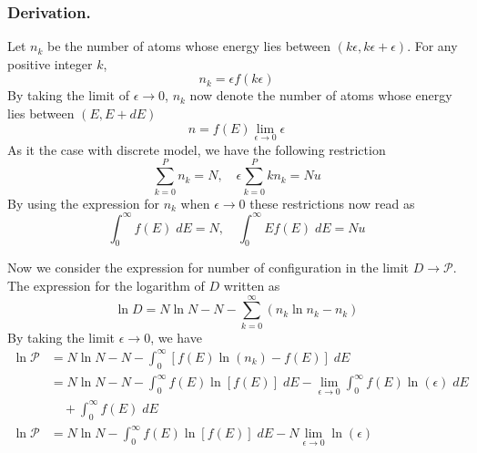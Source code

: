 \documentclass[../../../Main.tex]{subfiles}
\begin{document}
\subsubsection{Derivation.} Let $n_k$ be the number of atoms whose energy lies between $(k\epsilon, k\epsilon+\epsilon)$. For any positive integer $k$, 
\begin{equation*}
    n_k=\epsilon f(k\epsilon)
\end{equation*}
By taking the limit of $\epsilon\rightarrow0$, $n_k$ now denote the number of atoms whose energy lies between $(E, E+dE)$
\begin{equation*}
   n=f(E)\lim_{\epsilon\rightarrow0}\epsilon
\end{equation*}
As it the case with discrete model, we have the following restriction
\begin{equation*}
    \sum_{k=0}^{P}n_k=N,\quad \epsilon\sum_{k=0}^{P} kn_k=Nu
\end{equation*}
By using the expression for $n_k$ when $\epsilon\rightarrow0$ these restrictions now read as
\begin{equation*}
    \int_{0}^{\infty}f(E)\;dE=N,\quad \int_{0}^{\infty}Ef(E)\;dE=Nu
\end{equation*}

Now we consider the expression for number of configuration in the limit $D\rightarrow\mathcal{P}$. The expression for the logarithm of $D$ written as
\begin{equation*}
    \ln D=N\ln N-N-\sum_{k=0}^{\infty}\left(n_k\ln n_k-n_k\right)
\end{equation*}
By taking the limit $\epsilon\rightarrow0$, we have
\begin{align*}
    \ln \mathcal{P} &= N\ln N-N-\int_{0}^{\infty}\left[f(E)\ln (n_k)-f(E)\right]\;dE\\
    & = N\ln N-N-\int_{0}^{\infty}f(E)\ln[ f(E)]\;dE - \lim_{\epsilon\rightarrow0}\int_{0}^{\infty}f(E)\ln(\epsilon)\;dE \\
    &\quad+  \int_{0}^{\infty}f(E)\;dE \\
    \ln \mathcal{P}&=N\ln N-\int_{0}^{\infty}f(E)\ln [f(E)]\;dE - N\lim_{\epsilon\rightarrow0}\ln(\epsilon) 
\end{align*}
\end{document}
